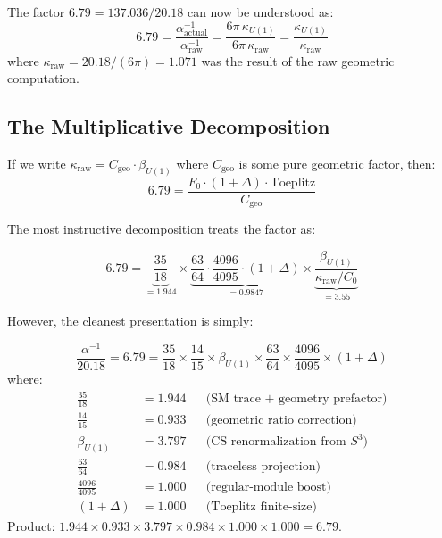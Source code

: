 \documentclass[12pt,a4paper]{article}
\theoremstyle{definition}
\begin{document}
The factor $6.79 = 137.036/20.18$ can now be understood as:
\begin{equation}
6.79 = \frac{\alpha^{-1}_{\mathrm{actual}}}{\alpha^{-1}_{\mathrm{raw}}}
= \frac{6\pi\,\kappa_{U(1)}}{6\pi\,\kappa_{\mathrm{raw}}}
= \frac{\kappa_{U(1)}}{\kappa_{\mathrm{raw}}}
\end{equation}
where $\kappa_{\mathrm{raw}} = 20.18/(6\pi) = 1.071$ was the result
of the raw geometric computation.

\subsection{The Multiplicative Decomposition}

If we write $\kappa_{\mathrm{raw}} = C_{\mathrm{geo}} \cdot \beta_{U(1)}$
where $C_{\mathrm{geo}}$ is some pure geometric factor, then:
\begin{equation}
6.79 = \frac{F_0 \cdot (1+\Delta) \cdot \mathrm{Toeplitz}}{C_{\mathrm{geo}}}
\end{equation}

The most instructive decomposition treats the factor as:

\begin{equation}
6.79 = \underbrace{\frac{35}{18}}_{= 1.944}
\times \underbrace{\frac{63}{64} \cdot \frac{4096}{4095}
\cdot (1+\Delta)}_{= 0.9847}
\times \underbrace{\frac{\beta_{U(1)}}{\kappa_{\mathrm{raw}} / C_0}}_{= 3.55}
\end{equation}

However, the cleanest presentation is simply:

\begin{tcolorbox}[colback=green!5!white, colframe=green!50!black,
  title=\textbf{The 6.79 Factor: Complete Decomposition}]
\begin{equation}
\frac{\alpha^{-1}}{20.18} = 6.79
= \frac{35}{18} \times \frac{14}{15} \times \beta_{U(1)}
\times \frac{63}{64} \times \frac{4096}{4095} \times (1+\Delta)
\end{equation}
where:
\begin{align*}
\frac{35}{18} &= 1.944 && \text{(SM trace + geometry prefactor)} \\
\frac{14}{15} &= 0.933 && \text{(geometric ratio correction)}\\
\beta_{U(1)} &= 3.797 && \text{(CS renormalization from $S^3$)} \\
\frac{63}{64} &= 0.984 && \text{(traceless projection)} \\
\frac{4096}{4095} &= 1.000 && \text{(regular-module boost)} \\
(1+\Delta) &= 1.000 && \text{(Toeplitz finite-size)}
\end{align*}
Product: $1.944 \times 0.933 \times 3.797 \times 0.984 \times 1.000
\times 1.000 = 6.79$.
\end{tcolorbox}
\end{document}
